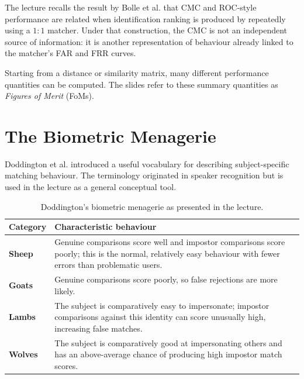 \documentclass[11pt,a4paper,oneside]{report}
\begin{document}
The lecture recalls the result by Bolle et al. that CMC and ROC-style
performance are related when identification ranking is produced by repeatedly
using a $1{:}1$ matcher.  Under that construction, the CMC is not an independent
source of information: it is another representation of behaviour already
linked to the matcher's FAR and FRR curves.

Starting from a distance or similarity matrix, many different performance
quantities can be computed.  The slides refer to these summary quantities as
\emph{Figures of Merit} (FoMs).

\section{The Biometric Menagerie}
\label{sec:biometric-menagerie}

Doddington et al. introduced a useful vocabulary for describing subject-specific
matching behaviour.  The terminology originated in speaker recognition but is
used in the lecture as a general conceptual tool.

\begin{table}[htbp]
\centering
\caption{Doddington's biometric menagerie as presented in the lecture.}
\label{tab:doddington-menagerie}
\small
\begin{tabularx}{\linewidth}{>{\bfseries}P{2.2cm} X}
\toprule
{}
Category & \textbf{Characteristic behaviour}\\
\midrule
Sheep & Genuine comparisons score well and impostor comparisons score poorly;
        this is the normal, relatively easy behaviour with fewer errors than
        problematic users.\\
Goats & Genuine comparisons score poorly, so false rejections are more likely.\\
Lambs & The subject is comparatively easy to impersonate; impostor comparisons
        against this identity can score unusually high, increasing false matches.\\
Wolves & The subject is comparatively good at impersonating others and has an
         above-average chance of producing high impostor match scores.\\
\bottomrule
\end{tabularx}
\end{table}
\end{document}

